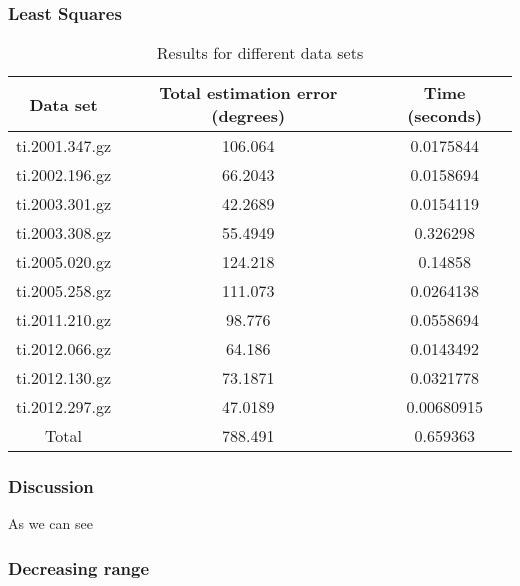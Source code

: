 \subsubsection{Least Squares}

\begin{table}[h!]
	\centering
	\def\arraystretch{1.2}
	\begin{tabular}{|c c c|} 
		\hline
		Data set & Total estimation error (degrees) & Time (seconds) \\ [0.5ex] 
		\hline\hline
		ti.2001.347.gz & 106.064 & 0.0175844 \\
		\hline
		ti.2002.196.gz & 66.2043 & 0.0158694 \\
		\hline
		ti.2003.301.gz & 42.2689 & 0.0154119 \\
		\hline
		ti.2003.308.gz & 55.4949 & 0.326298 \\
		\hline
		ti.2005.020.gz & 124.218 & 0.14858 \\
		\hline
		ti.2005.258.gz & 111.073 & 0.0264138 \\
		\hline
		ti.2011.210.gz & 98.776 & 0.0558694 \\
		\hline
		ti.2012.066.gz & 64.186 & 0.0143492 \\
		\hline
		ti.2012.130.gz & 73.1871 & 0.0321778 \\
		\hline
		ti.2012.297.gz & 47.0189 & 0.00680915 \\
		\hline\hline
		Total & 788.491 & 0.659363 \\
		\hline
	\end{tabular}
	\caption{Results for different data sets}
\end{table}

\subsubsection{Discussion}

As we can see

\subsubsection{Decreasing range}

